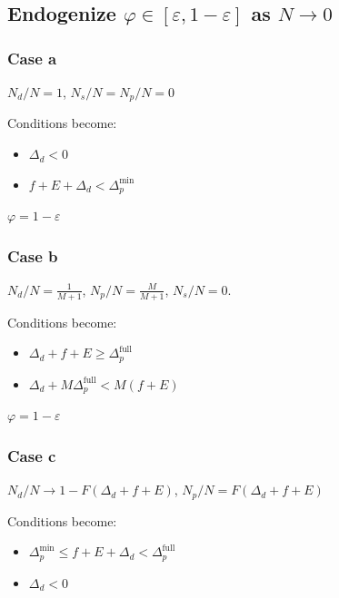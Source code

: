 \documentclass[english, a4paper]{article}
\theoremstyle{plain}
\theoremstyle{definition}
\theoremstyle{remark}
\begin{document}
    

    \subsection{Endogenize $\varphi \in [\varepsilon, 1 - \varepsilon]$ as $N \rightarrow 0$}


    \subsubsection{Case a}

    $N_d / N = 1$, $N_s / N = N_p / N = 0$
    
    Conditions become:
    \begin{itemize}
        \item $\Delta_d < 0$
        \item $f + E + \Delta_d < \Delta_p^{\text{min}}$
    \end{itemize}

    $\varphi = 1 - \varepsilon$

    \subsubsection{Case b}

    $N_d / N = \frac{1}{M + 1}$, $N_p / N = \frac{M}{M + 1}$, $N_s / N = 0$.
    
    Conditions become:
    \begin{itemize}
        \item $\Delta_d + f + E \geq \Delta_p^{\text{full}}$
        \item $\Delta_d + M\Delta_p^{\text{full}} < M(f + E)$
    \end{itemize}

    $\varphi = 1 - \varepsilon$

    \subsubsection{Case c}

    $N_d / N \rightarrow 1 - F(\Delta_d + f + E)$, $N_p / N = F(\Delta_d + f + E)$
    
    Conditions become:
    \begin{itemize}
        \item $\Delta_p^{\text{min}} \leq f + E + \Delta_d < \Delta_p^{\text{full}}$
        \item $\Delta_d < 0$
    \end{itemize}
\end{document}
